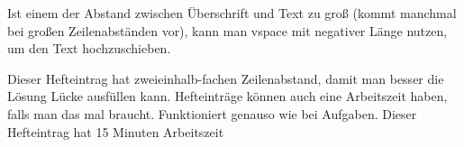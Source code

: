 {
    \vspace{-0.6cm}
    Ist einem der Abstand zwischen Überschrift und Text zu groß (kommt manchmal bei großen Zeilenabständen vor), kann man vspace mit negativer Länge nutzen, um den Text hochzuschieben.

    Dieser Hefteintrag hat zweieinhalb-fachen Zeilenabstand, damit man besser die Lösung Lücke ausfüllen kann. Hefteinträge können auch eine Arbeitszeit haben, falls man das mal braucht. Funktioniert genauso wie bei Aufgaben. Dieser Hefteintrag hat 15 Minuten Arbeitszeit
}